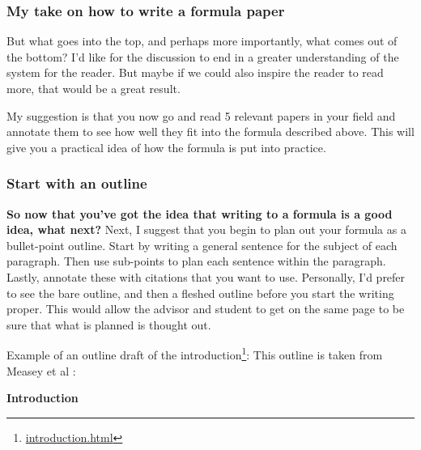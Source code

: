 \documentclass[
]{krantz}
\renewcommand{\href}[2]{#2\footnote{\url{#1}}}
\begin{document}
\hypertarget{my-take-on-how-to-write-a-formula-paper}{%
\subsubsection{My take on how to write a formula paper}\label{my-take-on-how-to-write-a-formula-paper}}

But what goes into the top, and perhaps more importantly, what comes out of the bottom? I'd like for the discussion to end in a greater understanding of the system for the reader. But maybe if we could also inspire the reader to read more, that would be a great result.

My suggestion is that you now go and read 5 relevant papers in your field and annotate them to see how well they fit into the formula described above. This will give you a practical idea of how the formula is put into practice.

\hypertarget{start-with-an-outline}{%
\subsubsection{Start with an outline}\label{start-with-an-outline}}

\textbf{So now that you've got the idea that writing to a formula is a good idea, what next? }
Next, I suggest that you begin to plan out your formula as a bullet-point outline. Start by writing a general sentence for the subject of each paragraph. Then use sub-points to plan each sentence within the paragraph. Lastly, annotate these with citations that you want to use. Personally, I'd prefer to see the bare outline, and then a fleshed outline before you start the writing proper. This would allow the advisor and student to get on the same page to be sure that what is planned is thought out.

Example of an outline draft of the \href{introduction.html}{introduction}:
This outline is taken from Measey et al \citeyearpar{measey2020cost}:

\textbf{Introduction}
\end{document}
